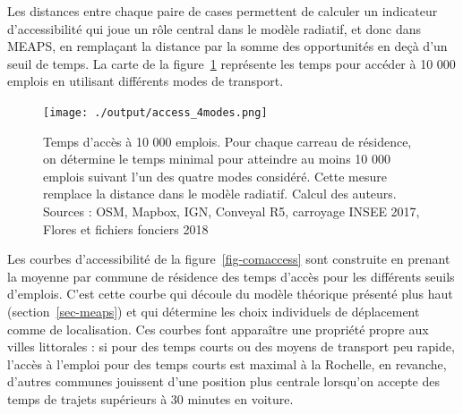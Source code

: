 \documentclass[
  10pt,
  a4paper,
  numbers=noendperiod,
  DIV=9]{scrreprt}
\begin{document}
Les distances entre chaque paire de cases permettent de calculer un
indicateur d'accessibilité qui joue un rôle central dans le modèle
radiatif, et donc dans MEAPS, en remplaçant la distance par la somme des
opportunités en deçà d'un seuil de temps. La carte de la
figure~\ref{fig-4access} représente les temps pour accéder à 10 000
emplois en utilisant différents modes de transport.

\begin{figure}[htb]

{\centering \texttt{[image: ./output/access\_4modes.png]}

}

\caption[Accessibilité à 10 000 emplois pour la
Rochelle]{\label{fig-4access}Temps d'accès à 10 000 emplois. Pour chaque
carreau de résidence, on détermine le temps minimal pour atteindre au
moins 10 000 emplois suivant l'un des quatre modes considéré. Cette
mesure remplace la distance dans le modèle radiatif. Calcul des auteurs.
Sources : OSM, Mapbox, IGN, Conveyal R5, carroyage INSEE 2017, Flores et
fichiers fonciers 2018}

\end{figure}

Les courbes d'accessibilité de la figure~\ref{fig-comaccess} sont
construite en prenant la moyenne par commune de résidence des temps
d'accès pour les différents seuils d'emplois. C'est cette courbe qui
découle du modèle théorique présenté plus haut (section~\ref{sec-meaps})
et qui détermine les choix individuels de déplacement comme de
localisation. Ces courbes font apparaître une propriété propre aux
villes littorales : si pour des temps courts ou des moyens de transport
peu rapide, l'accès à l'emploi pour des temps courts est maximal à la
Rochelle, en revanche, d'autres communes jouissent d'une position plus
centrale lorsqu'on accepte des temps de trajets supérieurs à 30 minutes
en voiture.
\end{document}
